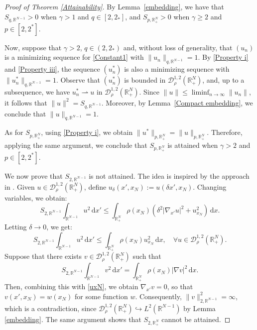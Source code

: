 \documentclass[12pt,reqno]{amsart}
\begin{document}
\begin{proof}[Proof of Theorem \ref{Attainability}]
By Lemma~\ref{embedding}, we have that $S_{q,\mathds{R}^{N-1}} > 0$ when $\gamma > 1$ and $q \in [2, 2_\ast]$, and $S_{p,\mathds{R}^N_+} > 0$ when $\gamma \geq 2$ and $p \in [2, 2^\ast]$.

Now, suppose that $\gamma>2$, $q\in (2,2_\ast)$ and, without loss of generality, that $(u_n)$ is a minimizing sequence for \eqref{Constant1} with $\|u_n\|_{q,\mathds{R}^{N-1}} = 1$. By \eqref{Property i} and \eqref{Property iii}, the sequence $(u_n^\ast)$ is also a minimizing sequence with $\|u_n^\ast\|_{q,\mathds{R}^{N-1}} = 1$. Observe that $(u_n^\ast)$ is bounded in $\mathcal{D}^{1,2}_\rho(\mathds{R}^N_+)$, and, up to a subsequence, we have $u_n^\ast \rightharpoonup u$ in $\mathcal{D}^{1,2}_\rho(\mathds{R}^N_+)$. Since $\|u\| \leq \liminf_{n\rightarrow \infty} \|u_n\|$, it follows that $\|u\|^2 = S_{q,\mathds{R}^{N-1}}$. Moreover, by Lemma~\ref{Compact embedding}, we conclude that $\|u\|_{q,\mathds{R}^{N-1}} = 1$. 

As for $S_{p,\mathds{R}^N_+}$, using \eqref{Property i}, we obtain $\|u^\ast\|_{p,\mathds{R}^N_+} = \|u\|_{p,\mathds{R}^N_+}$. Therefore, applying the same argument, we conclude that $S_{p,\mathds{R}^N_+}$ is attained when $\gamma>2$ and $p\in [2,2^\ast]$.

We now prove that $S_{2,\mathds{R}^{N-1}}$ is not attained. The idea is inspired by the approach in \cite{Abreu-Furtado-Medeiros 2}. Given $u \in \mathcal{D}^{1,2}_\rho(\mathds{R}^N_+)$, define $u_\delta(x', x_N) := u(\delta x', x_N)$. Changing variables, we obtain:
\begin{equation*}
    S_{2,\mathds{R}^{N-1}} \int_{\mathds{R}^{N-1}} u^2 \, \mathrm{d}x' \leq \int_{\mathds{R}^N_+} \rho(x_N) \left( \delta^2 |\nabla_{x'} u|^2 + u_{x_N}^2 \right) \, \mathrm{d}x.
\end{equation*}
Letting $\delta \to 0$, we get:
\begin{equation}\label{uxN}
    S_{2,\mathds{R}^{N-1}} \int_{\mathds{R}^{N-1}} u^2 \, \mathrm{d}x' \leq \int_{\mathds{R}^N_+} \rho(x_N) u_{x_N}^2 \, \mathrm{d}x, \quad \forall u \in \mathcal{D}^{1,2}_\rho(\mathds{R}^N_+).
\end{equation}
Suppose that there exists $v \in \mathcal{D}^{1,2}_\rho(\mathds{R}^N_+)$ such that
\begin{equation*}
    S_{2,\mathds{R}^{N-1}} \int_{\mathds{R}^{N-1}} v^2 \, \mathrm{d}x' = \int_{\mathds{R}^N_+} \rho(x_N) |\nabla v|^2 \, \mathrm{d}x.
\end{equation*}
Then, combining this with \eqref{uxN}, we obtain $\nabla_{x'} v = 0$, so that $v(x', x_N) = w(x_N)$ for some function $w$. Consequently, $\|v\|_{2, \mathds{R}^{N-1}}^2 = \infty$, which is a contradiction, since $\mathcal{D}^{1,2}_\rho(\mathds{R}^N_+) \hookrightarrow L^2(\mathds{R}^{N-1})$ by Lemma \ref{embedding}. The same argument shows that $S_{2,\mathds{R}^N_+}$ cannot be attained.
\end{proof}
\end{document}
